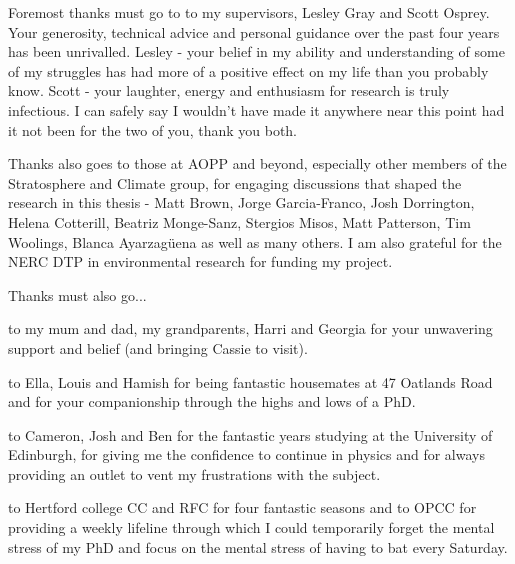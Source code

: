 \begin{acknowledgements}

Foremost thanks must go to to my supervisors, Lesley Gray and Scott Osprey. Your generosity, technical advice and personal guidance over the past four years has been unrivalled. Lesley - your belief in my ability and understanding of some of my struggles has had more of a positive effect on my life than you probably know. Scott - your laughter, energy and enthusiasm for research is truly infectious. I can safely say I wouldn't have made it anywhere near this point had it not been for the two of you, thank you both.

Thanks also goes to those at AOPP and beyond, especially other members of the Stratosphere and Climate group, for engaging discussions that shaped the research in this thesis - Matt Brown, Jorge Garcia-Franco, Josh Dorrington, Helena Cotterill, Beatriz Monge-Sanz, Stergios Misos, Matt Patterson, Tim Woolings, Blanca Ayarzagüena as well as many others. I am also grateful for the NERC DTP in environmental research for funding my project.

Thanks must also go...

to my mum and dad, my grandparents, Harri and Georgia for your unwavering support and belief (and bringing Cassie to visit).

to Ella, Louis and Hamish for being fantastic housemates at 47 Oatlands Road and for your companionship through the highs and lows of a PhD.

to Cameron, Josh and Ben for the fantastic years studying at the University of Edinburgh, for giving me the confidence to continue in physics and for always providing an outlet to vent my frustrations with the subject.


to Hertford college CC and RFC for four fantastic seasons and to OPCC for providing a weekly lifeline through which I could temporarily forget the mental stress of my PhD and focus on the mental stress of having to bat every Saturday. 
\end{acknowledgements}




